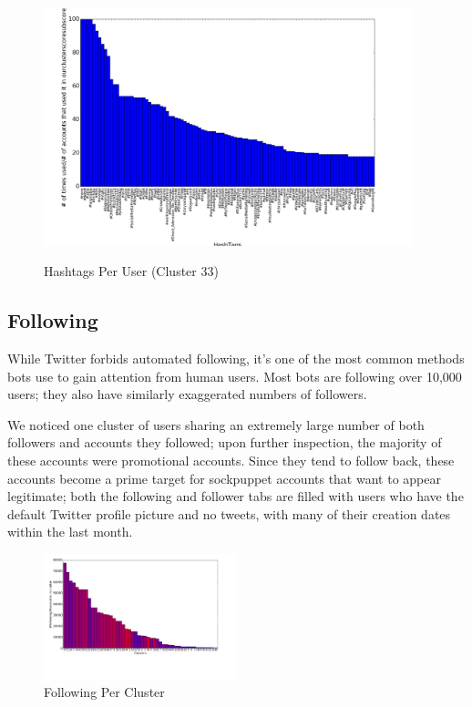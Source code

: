 \documentclass{sig-alternate-05-2015}
\begin{document}
\begin{figure}[h!]
	\caption{Hashtags Per User (Cluster 33)}
	\centering
		\includegraphics[width=0.95\textwidth]{imgs/bhvc33}
	\label{fig:hsh33}
\end{figure}

\subsection{Following}

While Twitter forbids automated following, it's one of the most common methods bots use to gain attention from human users. Most bots are following over 10,000 users; they also have similarly exaggerated numbers of followers.

We noticed one cluster of users sharing an extremely large number of both followers and accounts they followed; upon further inspection, the majority of these accounts were promotional accounts. Since they tend to follow back, these accounts become a prime target for sockpuppet accounts that want to appear legitimate; both the following and follower tabs are filled with users who have the default Twitter profile picture and no tweets, with many of their creation dates within the last month.

\begin{figure}[h!]
	\caption{Following Per Cluster}
	\centering
		\includegraphics[width=0.5\textwidth]{imgs/following}
\end{figure}
\end{document}
